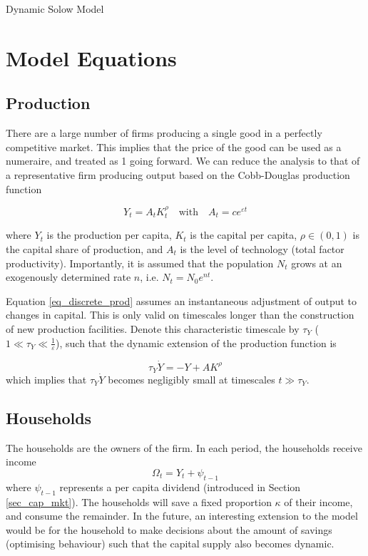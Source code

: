 \documentclass[11pt]{article}
\begin{document}
\begin{center}
\huge
Dynamic Solow Model
\end{center}

\section{Model Equations}

\subsection{Production}\label{sec_prod}

There are a large number of firms producing a single good in a perfectly competitive market. This implies that the price of the good can be used as a numeraire, and treated as 1 going forward. We can reduce the analysis to that of a representative firm producing output based on the Cobb-Douglas production function

\begin{equation}\label{eq_discrete_prod}
Y_t = A_tK_t^{\rho} \quad \textrm{with}\quad A_t=ce^{\varepsilon t}
\end{equation}

where $Y_t$ is the production per capita, $K_t$ is the capital per capita, $\rho\in (0,1)$ is the capital share of production, and $A_t$ is the level of technology (total factor productivity). Importantly, it is assumed that the population $N_t$ grows at an exogenously determined rate $n$, i.e. $N_t = N_0e^{nt}$.

Equation \eqref{eq_discrete_prod} assumes an instantaneous adjustment of output to changes in capital. This is only valid on timescales longer than the construction of new production facilities. Denote this characteristic timescale by $\tau_Y$ ($1\ll\tau_Y\ll\frac{1}{\varepsilon}$), such that the dynamic extension of the production function is

\begin{equation}\label{eq_dyn_prod}
\tau_Y \dot{Y} = -Y + AK^{\rho}
\end{equation}
which implies that $\tau_Y\dot{Y}$ becomes negligibly small at timescales $t\gg\tau_Y$.

\subsection{Households}\label{sec_hh}
The households are the owners of the firm. In each period, the households receive income
\begin{equation}\label{eq_hh_income}
\Omega_t = Y_t + \psi_{t-1}
\end{equation}
where $\psi_{t-1}$ represents a per capita dividend (introduced in Section \ref{sec_cap_mkt}). The households will save a fixed proportion $\kappa$ of their income, and consume the remainder. In the future, an interesting extension to the model would be for the household to make decisions about the amount of savings (optimising behaviour) such that the capital supply also becomes dynamic.
\end{document}
